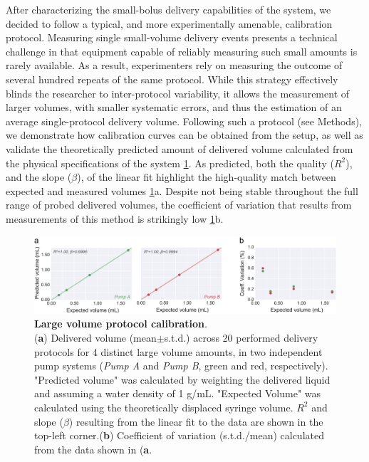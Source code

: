 After characterizing the small-bolus delivery capabilities of the system, we decided to follow a typical, and more experimentally amenable, calibration protocol. Measuring single small-volume delivery events presents a technical challenge in that equipment capable of reliably measuring such small amounts is rarely available. As a result, experimenters rely on measuring the outcome of several hundred repeats of the same protocol. While this strategy effectively blinds the researcher to inter-protocol variability, it allows the measurement of larger volumes, with smaller systematic errors, and thus the estimation of an average single-protocol delivery volume. Following such a protocol (see Methods), we demonstrate how calibration curves can be obtained from the setup, as well as validate the theoretically predicted amount of delivered volume calculated from the physical specifications of the system \ref{fig:LargeVolumeCalibration}. As predicted, both the quality  ($R^2$), and the slope ($\beta$), of the linear fit highlight the high-quality match between expected and measured volumes \ref{fig:LargeVolumeCalibration}a. Despite not being stable throughout the full range of probed delivered volumes, the coefficient of variation that results from measurements of this method is strikingly low \ref{fig:LargeVolumeCalibration}b. 

\begin{figure}[ht] 
	\centering
	\includegraphics[width=1.0\linewidth]{Figures/Artboard 6.pdf}
	\caption{\textbf{Large volume protocol calibration}.\\
		(\textbf{a}) Delivered volume (mean$\pm$s.t.d.) across 20 performed delivery protocols for 4 distinct large volume amounts, in two independent pump systems (\textit{Pump A} and \textit{Pump B}, green and red, respectively). "Predicted volume" was calculated by weighting the delivered liquid and assuming a water density of 1 g/mL. "Expected Volume" was calculated using the theoretically displaced syringe volume.  $R^{2}$ and slope ($\beta$) resulting from the linear fit to the data are shown in the top-left corner.(\textbf{b}) Coefficient of variation (s.t.d./mean) calculated from the data shown in (\textbf{a}.}
	\label{fig:LargeVolumeCalibration} 
\end{figure}

